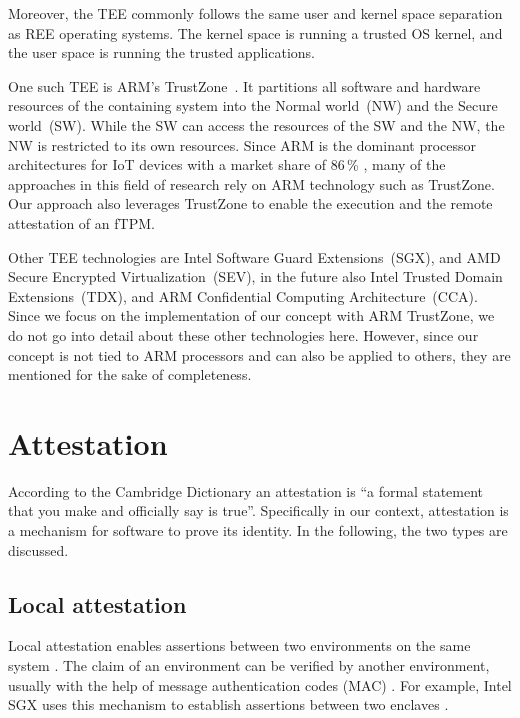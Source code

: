 Moreover, the \ac{TEE} commonly follows the same user and kernel space separation as \ac{REE} operating systems. The kernel space is running a trusted OS kernel, and the user space is running the trusted applications.

One such \ac{TEE} is ARM's TrustZone~\cite{ARM09}. It partitions all software and hardware resources of the containing system into the Normal world~(NW) and the Secure world~(SW).
While the SW can access the resources of the SW and the NW, the NW is restricted to its own resources.
Since ARM is the dominant processor architectures for IoT devices with a market share of 86\,\% \cite{eclipse}, many of the approaches in this field of research rely on ARM technology such as TrustZone.
Our approach also leverages TrustZone to enable the execution and the remote attestation of an fTPM.

Other \ac{TEE} technologies are Intel Software Guard Extensions~(SGX), and AMD Secure Encrypted Virtualization~(SEV), in the future also Intel Trusted Domain Extensions~(TDX), and ARM Confidential Computing Architecture~(CCA). Since we focus on the implementation of our concept with ARM TrustZone, we do not go into detail about these other technologies here. However, since our concept is not tied to ARM processors and can also be applied to others, they are mentioned for the sake of completeness.




\section{Attestation}

According to the Cambridge Dictionary an attestation is ``a formal statement that you make and officially say is true''.
Specifically in our context, attestation is a mechanism for software to prove its identity.
In the following, the two types are discussed.


\subsection{Local attestation}

Local attestation enables assertions between two environments on the same system \cite{Anati2013InnovativeTF}. The claim of an environment can be verified by another environment, usually with the help of message authentication codes (MAC) \cite{Menetrey2022}. For example, Intel SGX uses this mechanism to establish assertions between two enclaves \cite{Anati2013InnovativeTF}.

